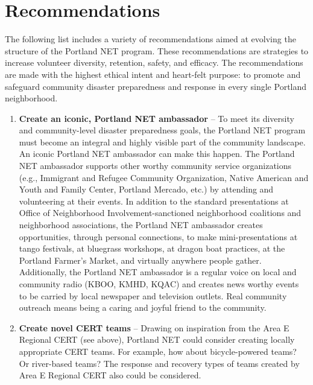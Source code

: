 \documentclass[11pt,fleqn]{book} %
\begin{document}
\section{Recommendations}

The following list includes a variety of recommendations aimed at evolving the structure of the Portland NET program. These recommendations are strategies to increase volunteer diversity, retention, safety, and efficacy. The recommendations are made with the highest ethical intent and heart-felt purpose: to promote and safeguard community disaster preparedness and response in every single Portland neighborhood.\\

\begin{enumerate}
  \item \textbf{Create an iconic, Portland NET ambassador} -- To meet its diversity and community-level disaster preparedness goals, the Portland NET program must become an integral and highly visible part of the community landscape. An iconic Portland NET ambassador can make this happen. The Portland NET ambassador supports other worthy community service organizations (e.g., Immigrant and Refugee Community Organization, Native American and Youth and Family Center, Portland Mercado, etc.) by attending and volunteering at their events. In addition to the standard presentations at Office of Neighborhood Involvement-sanctioned neighborhood coalitions and neighborhood associations, the Portland NET ambassador creates opportunities, through personal connections, to make mini-presentations at tango festivals, at bluegrass workshops, at dragon boat practices, at the Portland Farmer's Market, and virtually anywhere people gather. Additionally, the Portland NET ambassador is a regular voice on local and community radio (KBOO, KMHD, KQAC) and creates news worthy events to be carried by local newspaper and television outlets. Real community outreach means being a caring and joyful friend to the community. \\
  \item \textbf{Create novel CERT teams} -- Drawing on inspiration from the Area E Regional CERT (see above), Portland NET could consider creating locally appropriate CERT teams. For example, how about bicycle-powered teams? Or river-based teams? The response and recovery types of teams created by Area E Regional CERT also could be considered.\\

\end{enumerate}
\end{document}
